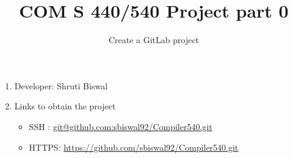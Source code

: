 \documentclass{article}
\title{COM S 440/540 Project part 0}
\date{}
\author{Create a GitLab project}
\begin{document}
\maketitle

\begin{enumerate}

\item
Developer: Shruti Biswal

\item Links to obtain the project
\begin{itemize}
\item SSH : \url{git@github.com:sbiswal92/Compiler540.git}

\item  HTTPS: \url{https://github.com/sbiswal92/Compiler540.git}
\end{itemize}

\end{enumerate}
\end{document}
